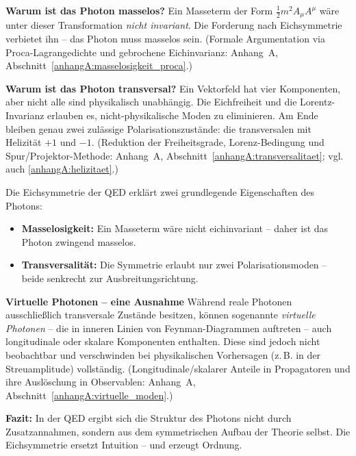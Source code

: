 \textbf{Warum ist das Photon masselos?}
Ein Masseterm der Form \( \frac{1}{2} m^2 A_\mu A^\mu \) wäre unter dieser Transformation \emph{nicht invariant}. Die Forderung nach Eichsymmetrie verbietet ihn – das Photon muss masselos sein.
(Formale Argumentation via Proca-Lagrange­dichte und gebrochene Eichinvarianz: Anhang~A, Abschnitt~\ref{anhangA:masselosigkeit_proca}.)

\textbf{Warum ist das Photon transversal?}
Ein Vektorfeld hat vier Komponenten, aber nicht alle sind physikalisch unabhängig. Die Eichfreiheit und die Lorentz-Invarianz erlauben es, nicht-physikalische Moden zu eliminieren. Am Ende bleiben genau zwei zulässige Polarisationszustände: die transversalen mit Helizität \( +1 \) und \( -1 \).
(Reduktion der Freiheitsgrade, Lorenz-Bedingung und Spur/Projektor-Methode: Anhang~A, Abschnitt~\ref{anhangA:transversalitaet}; vgl. auch \ref{anhangA:helizitaet}.)

\medskip
\begin{tcolorbox}[physikbox, title=Folgen der Eichsymmetrie]
	\label{box:folgen der Eichsy}
	\small
	Die Eichsymmetrie der QED erklärt zwei grundlegende Eigenschaften des Photons:
	
	\begin{itemize}
		\item \textbf{Masselosigkeit:} Ein Masseterm wäre nicht eichinvariant – daher ist das Photon zwingend masselos.
		\item \textbf{Transversalität:} Die Symmetrie erlaubt nur zwei Polarisationsmoden – beide senkrecht zur Ausbreitungsrichtung.
	\end{itemize}
\end{tcolorbox}

\textbf{Virtuelle Photonen – eine Ausnahme}
Während reale Photonen ausschließlich transversale Zustände besitzen, können sogenannte \emph{virtuelle Photonen} – die in inneren Linien von Feynman-Diagrammen auftreten – auch longitudinale oder skalare Komponenten enthalten.
Diese sind jedoch nicht beobachtbar und verschwinden bei physikalischen Vorhersagen (z.\,B. in der Streuamplitude) vollständig.
(Longitudinale/skalarer Anteile in Propagatoren und ihre Auslöschung in Observablen: Anhang~A, Abschnitt~\ref{anhangA:virtuelle_moden}.)

\textbf{Fazit:}
In der QED ergibt sich die Struktur des Photons nicht durch Zusatzannahmen, sondern aus dem symmetrischen Aufbau der Theorie selbst. Die Eichsymmetrie ersetzt Intuition – und erzeugt Ordnung.

